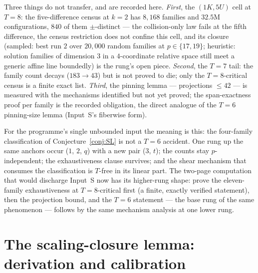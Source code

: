 \documentclass[11pt,a4paper]{article}
\numberwithin{equation}{section}
\theoremstyle{plain}
\theoremstyle{definition}
\theoremstyle{remark}
\begin{document}
Three things do not transfer, and are recorded here. \emph{First}, the
$(1K,5U)$ cell at $T=8$: the five-difference census at $k=2$ has $8{,}168$
families and $32.5$M configurations, $840$ of them $\pm$-distinct --- the
collision-only law fails at the fifth difference, the census restriction
does not confine this cell, and its closure (sampled: best run $2$ over
$20{,}000$ random families at $p\in\{17,19\}$; heuristic: solution
families of dimension $3$ in a $4$-coordinate relative space still meet a
generic affine line boundedly) is the rung's open piece. \emph{Second},
the $T=7$ tail: the family count decays ($183\to43$) but is not proved
to die; only the $T=8$-critical census is a finite exact list.
\emph{Third}, the pinning lemma --- projections $\le42$ --- is measured
with the mechanisms identified but not yet proved; the span-exactness
proof per family is the recorded obligation, the direct analogue of the
$T=6$ pinning-size lemma (Input~S's fiberwise form).

For the programme's single unbounded input the meaning is this: the
four-family classification of Conjecture~\ref{conj:SL} is not a $T=6$
accident. One rung up the same anchors occur ($1$, $2$, $q$) with a new
pair ($3$, $t$); the counts stay $p$-independent; the exhaustiveness
clause survives; and the shear mechanism that consumes the
classification is $T$-free in its linear part. The two-page computation
that would discharge Input~S now has its higher-rung shape: prove the
eleven-family exhaustiveness at $T=8$-critical first (a finite, exactly
verified statement), then the projection bound, and the $T=6$ statement
--- the base rung of the same phenomenon --- follows by the same
mechanism analysis at one lower rung.


\section{The scaling-closure lemma: derivation and calibration}\label{sec:scale}
\end{document}
